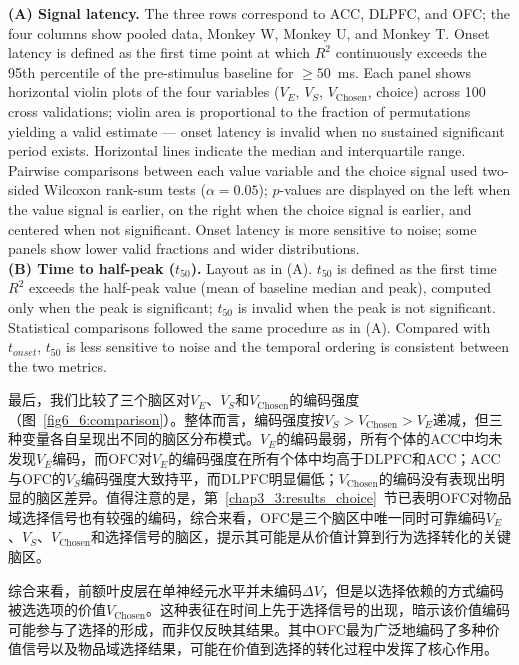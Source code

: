    {\textbf{(A) Signal latency.} The three rows correspond to ACC, DLPFC, and OFC; the four columns show pooled data, Monkey W, Monkey U, and Monkey T. Onset latency is defined as the first time point at which $R^2$ continuously exceeds the 95th percentile of the pre-stimulus baseline for $\geq 50$~ms. Each panel shows horizontal violin plots of the four variables ($V_E$, $V_S$, $V_\mathrm{Chosen}$, choice) across 100 cross validations; violin area is proportional to the fraction of permutations yielding a valid estimate — onset latency is invalid when no sustained significant period exists. Horizontal lines indicate the median and interquartile range. Pairwise comparisons between each value variable and the choice signal used two-sided Wilcoxon rank-sum tests ($\alpha = 0.05$); $p$-values are displayed on the left when the value signal is earlier, on the right when the choice signal is earlier, and centered when not significant. Onset latency is more sensitive to noise; some panels show lower valid fractions and wider distributions. \\
    \textbf{(B) Time to half-peak ($t_{50}$).} Layout as in (A). $t_{50}$ is defined as the first time $R^2$ exceeds the half-peak value (mean of baseline median and peak), computed only when the peak is significant; $t_{50}$ is invalid when the peak is not significant. Statistical comparisons followed the same procedure as in (A). Compared with $t_{onset}$, $t_{50}$ is less sensitive to noise and the temporal ordering is consistent between the two metrics.}

最后，我们比较了三个脑区对$V_E$、$V_S$和$V_\mathrm{Chosen}$的编码强度（图~\ref{fig6_6:comparison}）。整体而言，编码强度按$V_S > V_\mathrm{Chosen} > V_E$递减，但三种变量各自呈现出不同的脑区分布模式。$V_E$的编码最弱，所有个体的ACC中均未发现$V_E$编码，而OFC对$V_E$的编码强度在所有个体中均高于DLPFC和ACC；ACC与OFC的$V_S$编码强度大致持平，而DLPFC明显偏低；$V_\mathrm{Chosen}$的编码没有表现出明显的脑区差异。值得注意的是，第~\ref{chap3_3:results_choice}~节已表明OFC对物品域选择信号也有较强的编码，综合来看，OFC是三个脑区中唯一同时可靠编码$V_E$、$V_S$、$V_\mathrm{Chosen}$和选择信号的脑区，提示其可能是从价值计算到行为选择转化的关键脑区。

综合来看，前额叶皮层在单神经元水平并未编码$\Delta V$，但是以选择依赖的方式编码被选选项的价值$V_\mathrm{Chosen}$。这种表征在时间上先于选择信号的出现，暗示该价值编码可能参与了选择的形成，而非仅反映其结果。其中OFC最为广泛地编码了多种价值信号以及物品域选择结果，可能在价值到选择的转化过程中发挥了核心作用。

